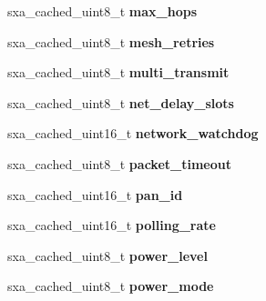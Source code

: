 \begin{DoxyCompactItemize}
\item 
\hypertarget{structsxa__node__t_aff8f109f646d13ad739b8a1968cd448c}{sxa\-\_\-cached\-\_\-uint8\-\_\-t {\bfseries max\-\_\-hops}}\label{structsxa__node__t_aff8f109f646d13ad739b8a1968cd448c}

\item 
\hypertarget{structsxa__node__t_a9f101d3b4bbdb6e537204aaea805e79d}{sxa\-\_\-cached\-\_\-uint8\-\_\-t {\bfseries mesh\-\_\-retries}}\label{structsxa__node__t_a9f101d3b4bbdb6e537204aaea805e79d}

\item 
\hypertarget{structsxa__node__t_a9f73e487a189f357e4c2d472fe280eeb}{sxa\-\_\-cached\-\_\-uint8\-\_\-t {\bfseries multi\-\_\-transmit}}\label{structsxa__node__t_a9f73e487a189f357e4c2d472fe280eeb}

\item 
\hypertarget{structsxa__node__t_a12b87380c0ae5a34354e9eae5c073ece}{sxa\-\_\-cached\-\_\-uint8\-\_\-t {\bfseries net\-\_\-delay\-\_\-slots}}\label{structsxa__node__t_a12b87380c0ae5a34354e9eae5c073ece}

\item 
\hypertarget{structsxa__node__t_af2a08d1eb0031318ec99dd9912bbd9ef}{sxa\-\_\-cached\-\_\-uint16\-\_\-t {\bfseries network\-\_\-watchdog}}\label{structsxa__node__t_af2a08d1eb0031318ec99dd9912bbd9ef}

\item 
\hypertarget{structsxa__node__t_a3a4e03433345119bd0bb6e347a7424a2}{sxa\-\_\-cached\-\_\-uint8\-\_\-t {\bfseries packet\-\_\-timeout}}\label{structsxa__node__t_a3a4e03433345119bd0bb6e347a7424a2}

\item 
\hypertarget{structsxa__node__t_a90ab3737ab9066793e4bce19727d6552}{sxa\-\_\-cached\-\_\-uint16\-\_\-t {\bfseries pan\-\_\-id}}\label{structsxa__node__t_a90ab3737ab9066793e4bce19727d6552}

\item 
\hypertarget{structsxa__node__t_aaba7c04f6808b9ca181417fa48a4536e}{sxa\-\_\-cached\-\_\-uint16\-\_\-t {\bfseries polling\-\_\-rate}}\label{structsxa__node__t_aaba7c04f6808b9ca181417fa48a4536e}

\item 
\hypertarget{structsxa__node__t_a8d8ab853c4db7da7889ddf177619eef8}{sxa\-\_\-cached\-\_\-uint8\-\_\-t {\bfseries power\-\_\-level}}\label{structsxa__node__t_a8d8ab853c4db7da7889ddf177619eef8}

\item 
\hypertarget{structsxa__node__t_a24a7cf27e344d37b32c65c7be8c9c9e7}{sxa\-\_\-cached\-\_\-uint8\-\_\-t {\bfseries power\-\_\-mode}}\label{structsxa__node__t_a24a7cf27e344d37b32c65c7be8c9c9e7}


\end{DoxyCompactItemize}
